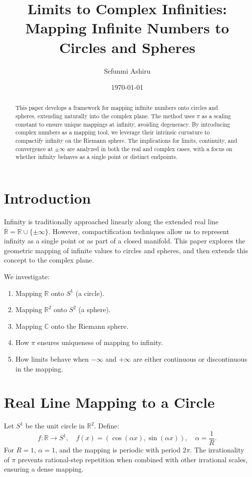 \documentclass[12pt]{article}
\title{Limits to Complex Infinities:\\ Mapping Infinite Numbers to Circles and Spheres}
\author{Sefunmi Ashiru}
\date{\today}
\begin{document}
\maketitle

\begin{abstract}
This paper develops a framework for mapping infinite numbers onto circles and spheres, extending naturally into the complex plane. The method uses $\pi$ as a scaling constant to ensure unique mappings at infinity, avoiding degeneracy. By introducing complex numbers as a mapping tool, we leverage their intrinsic curvature to compactify infinity on the Riemann sphere. The implications for limits, continuity, and convergence at $\pm\infty$ are analyzed in both the real and complex cases, with a focus on whether infinity behaves as a single point or distinct endpoints.
\end{abstract}

\section{Introduction}
Infinity is traditionally approached linearly along the extended real line $\overline{\mathbb{R}} = \mathbb{R} \cup \{\pm \infty\}$. However, compactification techniques allow us to represent infinity as a single point or as part of a closed manifold. This paper explores the geometric mapping of infinite values to circles and spheres, and then extends this concept to the complex plane.

We investigate:
\begin{enumerate}
    \item Mapping $\mathbb{R}$ onto $S^1$ (a circle).
    \item Mapping $\mathbb{R}^2$ onto $S^2$ (a sphere).
    \item Mapping $\mathbb{C}$ onto the Riemann sphere.
    \item How $\pi$ ensures uniqueness of mapping to infinity.
    \item How limits behave when $-\infty$ and $+\infty$ are either continuous or discontinuous in the mapping.
\end{enumerate}

\section{Real Line Mapping to a Circle}
Let $S^1$ be the unit circle in $\mathbb{R}^2$. Define:
\begin{equation}
f: \mathbb{R} \to S^1, \quad f(x) = (\cos(\alpha x), \sin(\alpha x)), \quad \alpha = \frac{1}{R}.
\end{equation}
For $R = 1$, $\alpha = 1$, and the mapping is periodic with period $2\pi$.  
The irrationality of $\pi$ prevents rational-step repetition when combined with other irrational scales, ensuring a dense mapping.
\end{document}
